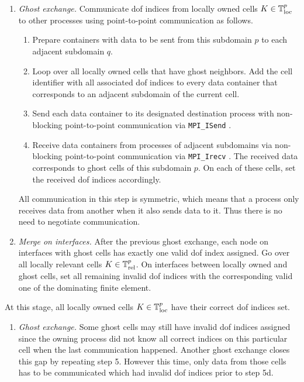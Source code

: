 \begin{enumerate}[resume]
  \item \textit{Ghost exchange.}
  Communicate \gls{dof} indices from locally owned cells $K \in \mathbb{T}^p_{\text{loc}}$ to other processes using point-to-point communication as follows.
  \begin{enumerate}[label=\alph*.]
    \item Prepare containers with data to be sent from this subdomain $p$ to each adjacent subdomain $q$.
    \item Loop over all locally owned cells that have ghost neighbors. Add the cell identifier with all associated \gls{dof} indices to every data container that corresponds to an adjacent subdomain of the current cell.
    \item Send each data container to its designated destination process with non-blocking point-to-point communication via \texttt{MPI\_ISend} \textcite{mpi31}.
    \item Receive data containers from processes of adjacent subdomains via non-blocking point-to-point communication via \texttt{MPI\_Irecv} \textcite{mpi31}. The received data corresponds to ghost cells of this subdomain $p$. On each of these cells, set the received \gls{dof} indices accordingly.
  \end{enumerate}
  All communication in this step is symmetric, which means that a process only receives data from another when it also sends data to it. Thus there is no need to negotiate communication.
  \item \textit{Merge on interfaces.}
  After the previous ghost exchange, each node on interfaces with ghost cells has exactly one valid \gls{dof} index assigned. Go over all locally relevant cells $K \in \mathbb{T}^p_{\text{rel}}$. On interfaces between locally owned and ghost cells, set all remaining invalid \gls{dof} indices with the corresponding valid one of the dominating finite element.
\end{enumerate}
At this stage, all locally owned cells $K \in \mathbb{T}^p_{\text{loc}}$ have their correct \gls{dof} indices set.
\begin{enumerate}[resume]
  \item \textit{Ghost exchange.}
  Some ghost cells may still have invalid \gls{dof} indices assigned since the owning process did not know all correct indices on this particular cell when the last communication happened. Another ghost exchange closes this gap by repeating step 5. However this time, only data from those cells has to be communicated which had invalid \gls{dof} indices prior to step 5d.
\end{enumerate}
